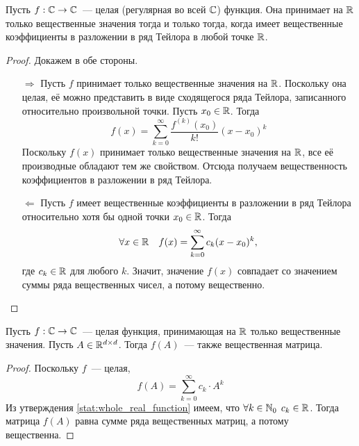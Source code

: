 \begin{statement}
    \label{stat:whole_real_function}
    Пусть $ f: \mathbb{C} \to \mathbb{C} $~--- целая (регулярная во всей $ \mathbb{C} $) функция.
    Она принимает на $ \mathbb{R} $ только вещественные значения тогда и только тогда,
    когда имеет вещественные коэффициенты в разложении в ряд Тейлора в любой точке $ \mathbb{R} $.
\end{statement}

\begin{proof}
    Докажем в обе стороны.
    \begin{itemize}
        \item[$ \Rightarrow $]
            Пусть $ f $ принимает только вещественные значения на $ \mathbb{R} $.
            Поскольку она целая, её можно представить в виде сходящегося ряда Тейлора,
            записанного относительно произвольной точки.
            Пусть $ x_0 \in \mathbb{R} $.
            Тогда
            \[
                f(x) = \sum_{k=0}^{\infty} \frac{f^{(k)}(x_0)}{k!} (x - x_0)^k
            \]
            Поскольку $ f(x) $ принимает только вещественные значения на $ \mathbb{R} $,
            все её производные обладают тем же свойством.
            Отсюда получаем вещественность коэффициентов в разложении в ряд Тейлора.
        \item[$ \Leftarrow $]
            Пусть $ f $ имеет вещественные коэффициенты в разложении в ряд Тейлора относительно хотя бы одной точки $ x_0 \in \mathbb{R} $.
            Тогда
            \[
                \forall x \in \mathbb{R} \quad f(x) = \sum_{k=0}^{\infty} c_k (x - x_0)^k,
            \]
            где $ c_k \in \mathbb{R} $ для любого $ k $.
            Значит, значение $ f(x) $ совпадает со значением суммы ряда вещественных чисел,
            а потому вещественно.
    \end{itemize}
\end{proof}

\begin{lemma}
    \label{lem:whole_real_function_matrix}
    Пусть $ f: \mathbb{C} \to \mathbb{C} $~--- целая функция, принимающая на $ \mathbb{R} $ только вещественные значения.
    Пусть $ A \in \mathbb{R}^{d \times d} $.
    Тогда $ f(A) $~--- также вещественная матрица.
\end{lemma}

\begin{proof}
    Поскольку $ f $~--- целая,
    \[
        f(A) = \sum_{k=0}^{\infty} c_k \cdot A^k
    \]
    Из утверждения \ref{stat:whole_real_function} имеем, что $ \forall k \in \mathbb{N}_0 \;\, c_k \in \mathbb{R} $.
    Тогда матрица $ f(A) $ равна сумме ряда вещественных матриц, а потому вещественна.
\end{proof}

